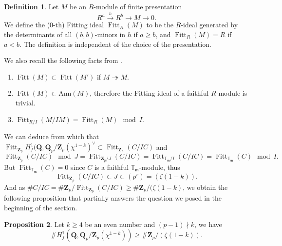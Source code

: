 \documentclass[11pt]{amsart}
\newcommand{\Q}{\mathbf{Q}}  %
\newcommand{\Z}{\mathbf{Z}}  %
\newcommand{\fitt}{\operatorname{Fitt}}
\theoremstyle{definition}
\newtheorem{definition}{Definition}[section]
\theoremstyle{definition}
\theoremstyle{definition}
\newtheorem{proposition}[definition]{Proposition}
\theoremstyle{definition}
\theoremstyle{definition}
\theoremstyle{definition}
\begin{document}
\begin{definition}
    Let $M$ be an $R$-module of finite presentation
    \begin{equation*}
        R^a\xrightarrow{h} R^b \to M\to 0.
    \end{equation*}
    We define the ($0$-th) Fitting ideal $\fitt_R(M)$ to be 
    the $R$-ideal generated by the determinants of all $(b,b)$-minors in $h$
    if $a\geq b$, and $\fitt_R(M)=R$ if $a<b$. The definition
    is independent of the choice of the presentation.
\end{definition}
We also recall the following facts from \cite[Appendix]{Mazur1984}.
\begin{enumerate}
    \item $\fitt(M)\subset \fitt(M')$ if $M\twoheadrightarrow M$.
    \item $\fitt(M)\subset \text{Ann}(M)$, therefore the Fitting ideal of a faithful $R$-module is trivial.
    \item $\fitt_{R/I}(M/IM)=\fitt_R(M)\mod I$.
\end{enumerate}
We can deduce from which that $\fitt_{\Z_p} H^1_f(\Q,\Q_p/\Z_p(\chi^{1-k})^\vee \subset \fitt_{\Z_p}(C/IC)$
and
\begin{equation*}
    \fitt_{\Z_p}(C/IC) \mod J=\fitt_{\Z_p/J}(C/IC)=\fitt_{\mathbb{T}_\mathfrak{m}/I}(C/IC)=\fitt_{\mathbb{T}_\mathfrak{m}}(C)\mod I.
\end{equation*}
But $\fitt_{\mathbb{T}_\mathfrak{m}}(C)=0$ since $C$ is a faithful $\mathbb{T}_\mathfrak{m}$-module, thus
\begin{equation*}
    \fitt_{\Z_p}(C/IC)\subset J\subset (p^r)=(\zeta(1-k)).
\end{equation*}
And as $\#C/IC=\# \Z_p/\fitt_{\Z_p}(C/IC)\geq \#\Z_p/(\zeta(1-k)$,
we obtain the following proposition that partially answers
the question we posed in the beginning of the section.
\begin{proposition}
   Let $k\geq 4$ be an even number and $(p-1)\nmid k$, we have
   \begin{equation*}
       \#H^1_f(\Q,\Q_p/\Z_p(\chi^{1-k}))\geq \#\Z_p/(\zeta(1-k)).
   \end{equation*}
\end{proposition}
\end{document}

